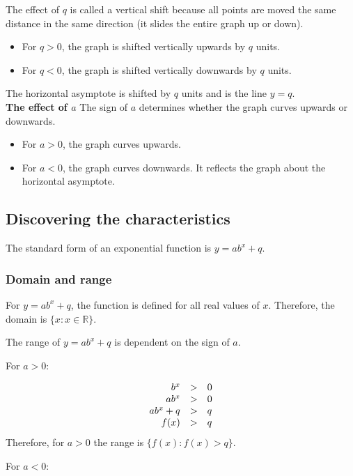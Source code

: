 The effect of $q$ is called a vertical shift because all points are moved the same distance in the same direction (it slides the entire graph up or down). 
\begin{itemize}
\item For $q>0$, the graph is shifted vertically upwards by $q$ units. 
\item For $q<0$, the graph is shifted vertically downwards by $q$ units.
\end{itemize}
The horizontal asymptote is shifted by $q$ units and is the line $y=q$. \vspace{8pt}\\


\textbf{The effect of $a$}\newline
The sign of $a$ determines whether the graph curves upwards or downwards. 
\begin{itemize}
 \item For $a>0$, the graph curves upwards.
\item For $a<0$, the graph curves downwards. It reflects the graph about the horizontal asymptote.
\end{itemize}

\subsection*{Discovering the characteristics}
The standard form of an exponential function is $y=ab^{x} + q$.
\subsubsection*{Domain and range}

For $y=ab^{x}+q$, the function is defined for all real values of $x$. Therefore, the domain is $\{x:x\in \mathbb{R}\}$.\par 
The range of $y=ab^{x}+q$ is dependent on the sign of $a$.\par 
For $a>0$:\par
\begin{equation*}
\begin{array}{ccc}\hfill b^{x}& > & 0\hfill \\
 \hfill ab^{x}& > & 0\hfill \\ 
\hfill ab^{x}+q& > & q\hfill \\ 
\hfill f(x)& > & q\hfill 
\end{array}
\end{equation*}
Therefore, for $a>0$ the range is $\{f(x):f(x) > q\}$.\par 
For $a<0$:\par 

